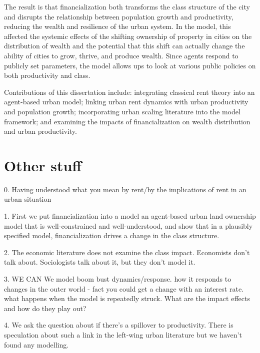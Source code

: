 The result is that financialization both transforms the class structure of the city and disrupts the relationship between population growth and productivity, reducing the wealth and resilience of the urban system. In the model, this affected the systemic effects of the shifting ownership of property in cities on the distribution of wealth and the potential that this shift can actually change the ability of cities to grow, thrive, and produce wealth. 
Since agents respond to publicly set parameters, the model allows ups to look at various public policies on both productivity and class. 

Contributions of this dissertation include: integrating classical rent theory into an agent-based urban model; linking urban rent dynamics with urban productivity and population growth; incorporating urban scaling literature into the model framework; and examining the impacts of financialization on wealth distribution and urban productivity.


\section{Other stuff}


0. Having understood what you mean by rent/by the implications of rent in an urban situation

1. First we put financialization into a model an agent-based urban land ownership model that is well-constrained and well-understood, and show that in a plausibly specified model, financialization drives a change in the class structure. 

2. The economic literature does not examine the class impact. Economists don't talk about. Sociologists talk about it, but they don't model it.

3. WE CAN We model boom bust dynamics/response. how it responds to changes in the outer world - fact you could get a change with an interest rate. what happens when the model is repeatedly struck. What are the impact effects and how do they play out?

4.  We ask the question about if there's a spillover to productivity. There is speculation about such a link in the left-wing urban literature but we haven't found any modelling.

